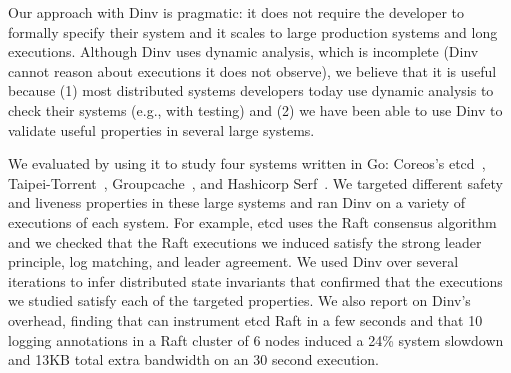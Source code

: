


%

Our approach with Dinv is pragmatic: it does not require the developer
to formally specify their system and it scales to large production
systems and long executions. Although Dinv uses dynamic analysis,
which is incomplete (Dinv cannot reason about executions it does not
observe), we believe that it is useful because (1) most distributed
systems developers today use dynamic analysis to check their systems
(e.g., with testing) and (2) we have been able to use Dinv to
validate useful properties in several large systems.


We evaluated \dinv by using it to study four systems written in Go:
Coreos's etcd~\cite{etcdraft}, Taipei-Torrent~\cite{taipeitorrent},
Groupcache~\cite{groupcache}, and Hashicorp Serf~\cite{serf}. We
targeted different safety and liveness properties in these large
systems and ran Dinv on a variety of executions of each system.  For
example, etcd uses the Raft consensus algorithm~\cite{RaftATC14} and we
checked that the Raft executions we induced satisfy the strong leader
principle, log matching, and leader agreement. We used Dinv over
several iterations to infer distributed state invariants that
confirmed that the executions we studied satisfy each of the targeted
properties. We also report on Dinv's overhead, finding that \dinv can
instrument etcd Raft in a few seconds and that 10 logging annotations
in a Raft cluster of 6 nodes induced a 24\% system
slowdown and 13KB total extra bandwidth on an 30 second
execution.


